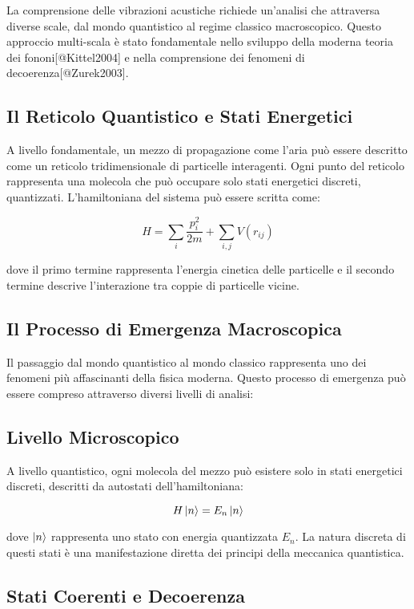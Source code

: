 \documentclass[a4paper,11pt]{article}
\begin{document}
La comprensione delle vibrazioni acustiche richiede un'analisi che
attraversa diverse scale, dal mondo quantistico al regime classico
macroscopico. Questo approccio multi-scala è stato fondamentale nello
sviluppo della moderna teoria dei fononi{[}@Kittel2004{]} e nella
comprensione dei fenomeni di decoerenza{[}@Zurek2003{]}.

\subsection{Il Reticolo Quantistico e Stati
Energetici}\label{il-reticolo-quantistico-e-stati-energetici}

A livello fondamentale, un mezzo di propagazione come l'aria può essere
descritto come un reticolo tridimensionale di particelle interagenti.
Ogni punto del reticolo rappresenta una molecola che può occupare solo
stati energetici discreti, quantizzati. L'hamiltoniana del sistema può
essere scritta come:

\[H = \sum_i \frac{p_i^2}{2m} + \sum_{i,j} V(r_{ij})\]

dove il primo termine rappresenta l'energia cinetica delle particelle e
il secondo termine descrive l'interazione tra coppie di particelle
vicine.

\subsection{Il Processo di Emergenza
Macroscopica}\label{il-processo-di-emergenza-macroscopica}

Il passaggio dal mondo quantistico al mondo classico rappresenta uno dei
fenomeni più affascinanti della fisica moderna. Questo processo di
emergenza può essere compreso attraverso diversi livelli di analisi:

\subsection{Livello Microscopico}\label{livello-microscopico}

A livello quantistico, ogni molecola del mezzo può esistere solo in
stati energetici discreti, descritti da autostati dell'hamiltoniana:

\[H\ket{n} = E_n\ket{n}\]

dove \(\ket{n}\) rappresenta uno stato con energia quantizzata \(E_n\).
La natura discreta di questi stati è una manifestazione diretta dei
principi della meccanica quantistica.

\subsection{Stati Coerenti e
Decoerenza}\label{stati-coerenti-e-decoerenza}
\end{document}
